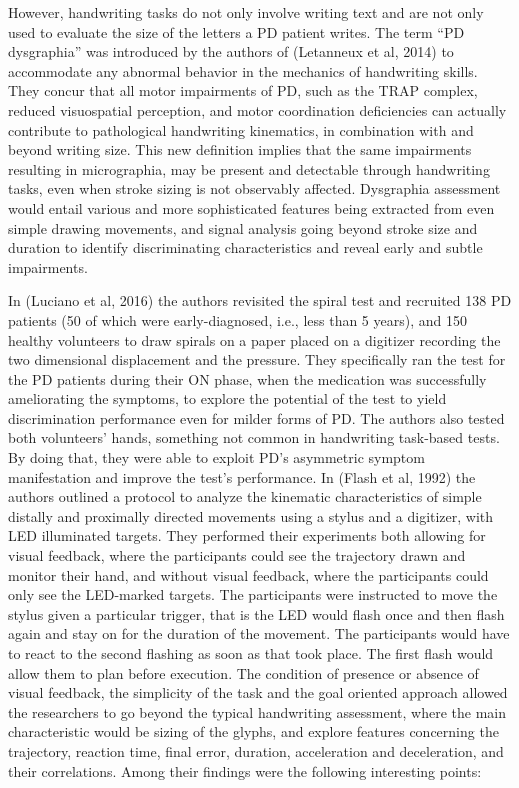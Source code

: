 However, handwriting tasks do not only involve writing text and are not only used to evaluate the size of the letters a \gls{PD} patient writes. The term ``PD dysgraphia'' was introduced by the authors of (Letanneux et al, 2014) to accommodate any abnormal behavior in the mechanics of handwriting skills. They concur that all motor impairments of \gls{PD}, such as the \gls{TRAP} complex, reduced visuospatial perception, and motor coordination deficiencies can actually contribute to pathological handwriting kinematics, in combination with and beyond writing size. This new definition implies that the same impairments resulting in micrographia, may be present and detectable through handwriting tasks, even when stroke sizing is not observably affected. Dysgraphia assessment would entail various and more sophisticated features being extracted from even simple drawing movements, and signal analysis going beyond stroke size and duration to identify discriminating characteristics and reveal early and subtle impairments. 

In (Luciano et al, 2016) the authors revisited the spiral test and recruited 138 \gls{PD} patients (50 of which were early-diagnosed, i.e., less than 5 years), and 150 healthy volunteers to draw spirals on a paper placed on a digitizer recording the two dimensional displacement and the pressure. They specifically ran the test for the \gls{PD} patients during their ON phase, when the medication was successfully ameliorating the symptoms, to explore the potential of the test to yield discrimination performance even for milder forms of \gls{PD}. The authors also tested both volunteers' hands, something not common in handwriting task-based tests. By doing that, they were able to exploit \gls{PD}'s asymmetric symptom manifestation and improve the test's performance. 
In (Flash et al, 1992) the authors outlined a protocol to analyze the kinematic characteristics of simple distally and proximally directed movements using a stylus and a digitizer, with \gls{LED} illuminated targets. They performed their experiments both allowing for visual feedback, where the participants could see the trajectory drawn and monitor their hand, and without visual feedback, where the participants could only see the \gls{LED}-marked targets. The participants were instructed to move the stylus given a particular trigger, that is the LED would flash once and then flash again and stay on for the duration of the movement. The participants would have to react to the second flashing as soon as that took place. The first flash would allow them to plan before execution. The condition of presence or absence of visual feedback, the simplicity of the task and the goal oriented approach allowed the researchers to go beyond the typical handwriting assessment, where the main characteristic would be sizing of the glyphs, and explore features concerning the trajectory, reaction time, final error, duration, acceleration and deceleration, and their correlations. Among their findings were the following interesting points:

